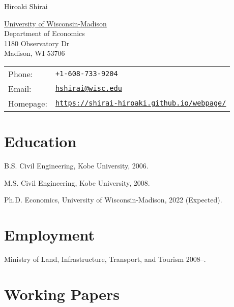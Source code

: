 \documentclass[letterpaper]{article}
\def\name{Hiroaki Shirai}
\renewenvironment{itemize}{
  \begin{list}{}{
    \setlength{\leftmargin}{1.5em}
  }
}{
  \end{list}
}
\begin{document}
{\huge \name}


\vspace{0.25in}

\begin{minipage}{0.45\linewidth}
  \href{http://www.unc.edu/}{University of Wisconsin-Madison} \\
  Department of Economics \\
  1180 Observatory Dr \\
  Madison, WI 53706
\end{minipage}
\begin{minipage}{0.45\linewidth}
  \begin{tabular}{ll}
    Phone: & {\tt +1-608-733-9204} \\
    Email: & \href{mailto:hshirai@wisc.edu}{\tt hshirai@wisc.edu} \\
    Homepage: & \href{https://shirai-hiroaki.github.io/webpage/}{\tt https://shirai-hiroaki.github.io/webpage/} \\
  \end{tabular}
\end{minipage}

\section*{Education}

\begin{itemize}
  \item B.S. Civil Engineering, Kobe University, 2006.
  \item M.S. Civil Engineering, Kobe University, 2008.
  \item Ph.D. Economics, University of Wisconsin-Madison, 2022 (Expected).
\end{itemize}


\section*{Employment}

\begin{itemize}
\item Ministry of Land, Infrastructure, Transport, and Tourism 2008--.
\end{itemize}


\section*{Working Papers}
\end{document}
